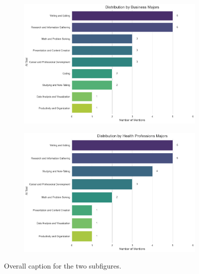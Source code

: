 \documentclass[12pt]{article}
\begin{document}
\begin{figure}[htbp]
\begin{subfigure}[b]{0.45\textwidth}
    \includegraphics[width=\textwidth]{fig6-3.png} %
    \label{fig:subfig1b}
  \end{subfigure}
  \hfill %
  \begin{subfigure}[b]{0.45\textwidth}
    \includegraphics[width=\textwidth]{fig6-4.png} %
    \label{fig:subfig1b}
  \end{subfigure}
  \caption{Overall caption for the two subfigures.}
  \label{fig:subfigures1}
\end{figure}
\end{document}
